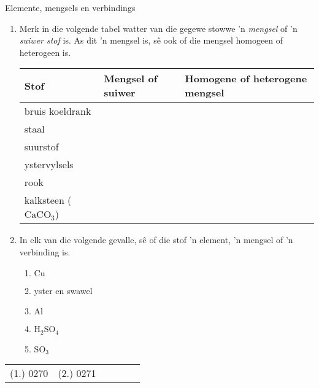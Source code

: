             \begin{exercises}{Elemente, mengsels en verbindings}{
            \nopagebreak \vspace{-1cm}
            \label{m38708*id63472}
 \begin{enumerate}[noitemsep, label=\textbf{\arabic*}. ] 
            \label{m38708*uid28}
    \item Merk in die volgende tabel watter van die gegewe stowwe 'n \textsl{mengsel} of 'n \textsl{suiwer stof} is. As dit 'n mengsel is, sê ook of die mengsel homogeen of heterogeen is.
          \begin{table}[H]
        \begin{center}
      \label{m38708*id63499}
    \noindent
      \begin{tabular}{|l|l|l|}\hline
        \textbf{Stof} &
        \textbf{Mengsel of suiwer} &
        \textbf{Homogene of heterogene mengsel} \\ \hline
        bruis koeldrank & & \\ \hline
        staal & & \\ \hline
        suurstof & & \\ \hline
        ystervylsels & & \\ \hline
        rook & & \\ \hline
        kalksteen (${\text{CaCO}}_{3}$) & & \\ \hline
    \end{tabular}
      \end{center}
\end{table}
\vspace{-.5cm}
\label{m38708*uid29}\item In elk van die volgende gevalle, sê of die stof 'n element, 'n mengsel of 'n verbinding is.
\label{m38708*id63912}\begin{enumerate}[noitemsep, label=\textbf{\alph*}. ] 
            \label{m38708*uid30}\item $\text{Cu}$
\label{m38708*uid31}\item yster en swawel
\label{m38708*uid32}\item $\text{Al}$
\label{m38708*uid33}\item $\text{H}{}_{2}\text{SO}{}_{4}$
\label{m38708*uid34}\item $\text{SO}{}_{3}$\end{enumerate}
                \end{enumerate}
\vspace{-.5cm}
\practiceinfo
\begin{tabular}[h]{cccccc}
 (1.) 0270  &  (2.) 0271  & 
\end{tabular}
}
\end{exercises}
